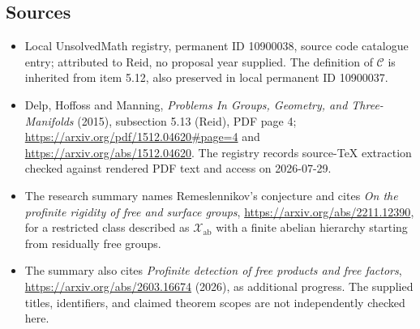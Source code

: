 \documentclass[11pt]{article}
\begin{document}
\subsection{Sources}
\begin{itemize}
\item Local UnsolvedMath registry, permanent ID 10900038, source code catalogue entry; attributed to Reid, no proposal year supplied. The definition of $\mathcal C$ is inherited from item 5.12, also preserved in local permanent ID 10900037.
\item Delp, Hoffoss and Manning, \emph{Problems In Groups, Geometry, and Three-Manifolds} (2015), subsection 5.13 (Reid), PDF page 4; \url{https://arxiv.org/pdf/1512.04620#page=4} and \url{https://arxiv.org/abs/1512.04620}. The registry records source-TeX extraction checked against rendered PDF text and access on 2026-07-29.
\item The research summary names Remeslennikov's conjecture and cites \emph{On the profinite rigidity of free and surface groups}, \url{https://arxiv.org/abs/2211.12390}, for a restricted class described as $\mathcal X_{\mathrm{ab}}$ with a finite abelian hierarchy starting from residually free groups.
\item The summary also cites \emph{Profinite detection of free products and free factors}, \url{https://arxiv.org/abs/2603.16674} (2026), as additional progress. The supplied titles, identifiers, and claimed theorem scopes are not independently checked here.
\end{itemize}
\end{document}
